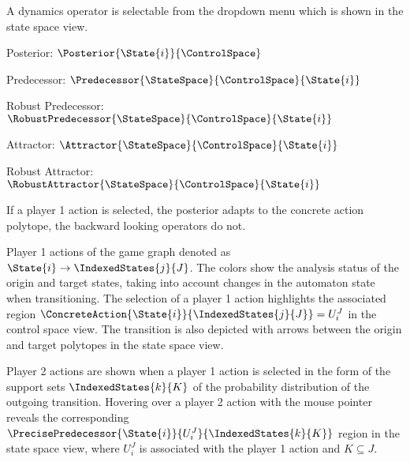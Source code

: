         A dynamics operator is selectable from the dropdown menu which is shown in the state space view.

        \startitemize[packed]
            \item{Posterior: $\Posterior{\State{i}}{\ControlSpace}$}
            \item{Predecessor: $\Predecessor{\StateSpace}{\ControlSpace}{\State{i}}$}
            \item{Robust Predecessor: $\RobustPredecessor{\StateSpace}{\ControlSpace}{\State{i}}$}
            \item{Attractor: $\Attractor{\StateSpace}{\ControlSpace}{\State{i}}$}
            \item{Robust Attractor: $\RobustAttractor{\StateSpace}{\ControlSpace}{\State{i}}$}
        \stopitemize

        If a player 1 action is selected, the posterior adapts to the concrete action polytope, the backward looking operators do not.

    \stopsubsubject

    \startsubsubject[title={Widget: Actions}]

        Player 1 actions of the game graph denoted as $\State{i} \rightarrow \IndexedStates{j}{J}$.
        The colors show the analysis status of the origin and target states, taking into account changes in the automaton state when transitioning.
        The selection of a player 1 action highlights the associated region $\ConcreteAction{\State{i}}{\IndexedStates{j}{J}} = U_i^J$ in the control space view.
        The transition is also depicted with arrows between the origin and target polytopes in the state space view.

        Player 2 actions are shown when a player 1 action is selected in the form of the support sets $\IndexedStates{k}{K}$ of the probability distribution of the outgoing transition.
        Hovering over a player 2 action with the mouse pointer reveals the corresponding $\PrecisePredecessor{\State{i}}{U_i^J}{\IndexedStates{k}{K}}$ region in the state space view, where $U_i^J$ is associated with the player 1 action and $K \subseteq J$.

    \stopsubsubject

\stopsubject


\startsubject[title=System Widgets]

